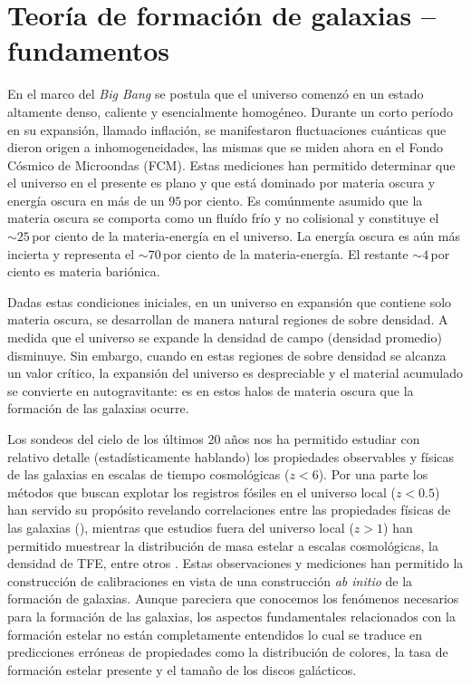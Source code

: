 \documentclass{article}
\begin{document}
\section{Teoría de formación de galaxias -- fundamentos}
%
En el marco del \emph{Big Bang} se postula que el universo comenzó en un estado altamente denso,
caliente y esencialmente homogéneo. Durante un corto período en su expansión, llamado inflación, se
manifestaron fluctuaciones cuánticas que dieron origen a inhomogeneidades, las mismas que se miden
ahora en el Fondo Cósmico de Microondas (FCM).
Estas mediciones han permitido determinar que el universo en el presente es plano y que está
dominado por materia oscura y energía oscura en más de un $95\,$por ciento. Es comúnmente asumido
que la materia oscura se comporta como un fluído frío y no colisional y constituye el $\sim25\,$por
ciento de la materia-energía en el universo.
La energía oscura es aún más incierta y representa el $\sim70\,$por ciento de la materia-energía. El
restante $\sim4\,$por ciento es materia bariónica.

Dadas estas condiciones iniciales, en un universo en expansión que contiene solo materia oscura, se
desarrollan de manera natural regiones de sobre densidad.
A medida que el universo se expande la densidad de campo (densidad promedio) disminuye.
Sin embargo, cuando en estas regiones de sobre densidad se alcanza un valor crítico, la expansión
del universo es despreciable y el material acumulado se convierte en autogravitante: es en estos
halos de materia oscura que la formación de las galaxias ocurre.

Los sondeos del cielo de los últimos 20 años nos ha permitido estudiar con relativo detalle
(estadísticamente hablando) los propiedades observables y físicas de las galaxias en escalas de
tiempo cosmológicas ($z<6$). Por una parte los métodos que buscan explotar los registros fósiles en
el universo local ($z<0.5$) han servido su propósito revelando correlaciones entre las propiedades
físicas de las galaxias (\cites[la relación masa-metalicidad,][]{Tremonti2004, Sanchez2013}[la
relación edad-metalicidad,][]{Worthey1994, Gallazzi2005, Panter2008}), mientras que estudios fuera
del universo local ($z>1$) han permitido muestrear la distribución de masa estelar a escalas
cosmológicas, la densidad de TFE, entre otros \citep[véase][para una revisión completa]{Madau2014}.
Estas observaciones y mediciones han permitido la construcción de calibraciones en vista de una
construcción \emph{ab initio} de la formación de galaxias. Aunque pareciera que conocemos los
fenómenos necesarios para la formación de las galaxias, los aspectos fundamentales relacionados con
la formación estelar no están completamente entendidos lo cual se traduce en predicciones erróneas
de propiedades como la distribución de colores, la tasa de formación estelar presente y el tamaño de
los discos galácticos.
\end{document}
